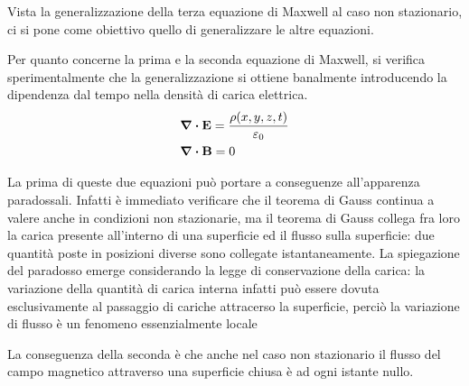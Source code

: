 Vista la generalizzazione della terza equazione di Maxwell al caso non stazionario,
ci si pone come obiettivo quello di generalizzare le altre equazioni.
\begin{obses}
    Per quanto concerne la prima e la seconda equazione di Maxwell,
    si verifica sperimentalmente che la generalizzazione
    si ottiene banalmente introducendo la dipendenza dal tempo nella densità di carica elettrica.
    \[
        \begin{split}
            &\div{\vb{E}}=\frac{\rho(x,y,z,t)}{\varepsilon_0}\\
            &\div{\vb{B}}=0
        \end{split}
    \]
\end{obses}

La prima di queste due equazioni può portare a conseguenze all'apparenza paradossali.
Infatti è immediato verificare che il teorema di Gauss continua a valere anche in condizioni non stazionarie,
ma il teorema di Gauss collega fra loro la carica presente all'interno di una superficie
ed il flusso sulla superficie: due quantità poste in posizioni diverse sono collegate istantaneamente.
La spiegazione del paradosso emerge considerando la legge di conservazione della carica:
la variazione della quantità di carica interna infatti può essere dovuta esclusivamente al passaggio di cariche
attracerso la superficie, perciò la variazione di flusso è un fenomeno essenzialmente locale

La conseguenza della seconda è che anche nel caso non stazionario
il flusso del campo magnetico attraverso una superficie chiusa è ad ogni istante nullo.
